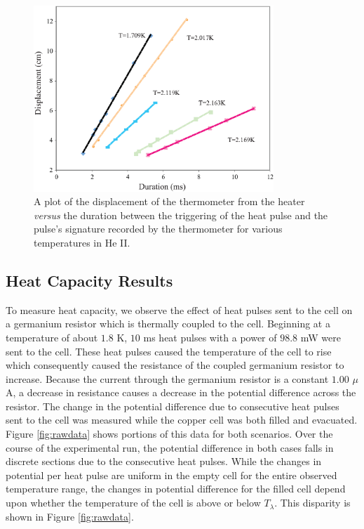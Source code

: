 \begin{figure}[htbp]
\begin{center}
\includegraphics[height=70mm]{./figures/secondsoundraw.eps}
\caption{\small{A plot of the displacement of the thermometer from the heater \emph{versus} the duration between the triggering of the heat pulse and the pulse's signature recorded by the thermometer for various temperatures in He II.}}
\label{fig:secondsoundraw}
\end{center}
\end{figure}


\subsection{Heat Capacity Results}\label{heatcapacityresults}

To measure heat capacity, we observe the effect of heat pulses sent to the cell on a germanium resistor which is thermally coupled to the cell. Beginning at a temperature of about $1.8$ K, $10$ ms heat pulses with a power of $98.8$ mW were sent to the cell.  These heat pulses caused the temperature of the cell to rise which consequently caused the resistance of the coupled germanium resistor to increase.  Because the current through the germanium resistor is a constant $1.00$ $\mu$A, a decrease in resistance causes a decrease in the potential difference across the resistor. The change in the potential difference due to consecutive heat pulses sent to the cell was measured while the copper cell was both filled and evacuated. Figure \ref{fig:rawdata} shows portions of this data for both scenarios.  Over the course of the experimental run, the potential difference in both cases falls in discrete sections due to the consecutive heat pulses. While the changes in potential per heat pulse are uniform in the empty cell for the entire observed temperature range, the changes in potential difference for the filled cell depend upon whether the temperature of the cell is above or below $T_{\lambda}$. This disparity is shown in Figure \ref{fig:rawdata}. 

